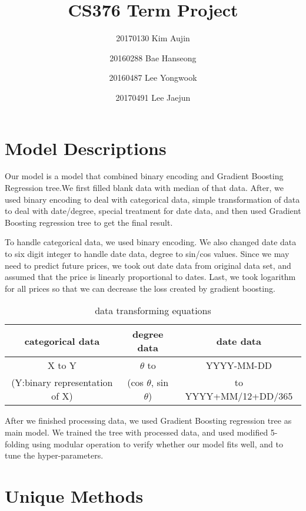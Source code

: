 \documentclass{article}
\title{CS376 Term Project}
\author{20170130 Kim Aujin\and20160288 Bae Hanseong\and20160487 Lee Yongwook\and20170491 Lee Jaejun}
\begin{document}
\maketitle

\section{Model Descriptions}
Our model is a model that combined binary encoding and Gradient Boosting Regression tree.We first filled blank data with median of that data. After, we used binary encoding to deal with categorical data, simple transformation of data to deal with date/degree, special treatment for date data, and then used Gradient Boosting regression tree to get the final result.\par
To handle categorical data, we used binary encoding. We also changed date data to six digit integer to handle date data, degree to sin/cos values. Since we may need to predict future prices, we took out date data from original data set, and assumed that the price is linearly proportional to dates. Last, we took logarithm for all prices so that we can decrease the loss created by gradient boosting.\par
\begin{table} [ht]
\begin{center}
\caption{data transforming equations}
\begin{tabular} {c |c| c}
  \textbf{categorical data} & \textbf{degree data} & \textbf{date data}\\
\hline
X to Y &  $\theta$ to  & YYYY-MM-DD\\
(Y:binary representation of X) & (cos $\theta$, sin $\theta$) & to YYYY+MM/12+DD/365\\
\end{tabular}
\end{center}
\end{table}
After we finished processing data, we used Gradient Boosting regression tree as main model. We trained the tree with processed data, and used modified 5-folding using modular operation to verify whether our model fits well, and to tune the hyper-parameters.

\section{Unique Methods}
\end{document}
